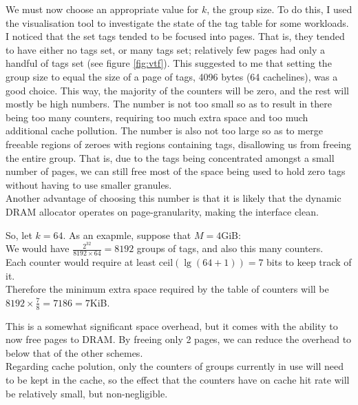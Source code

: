We must now choose an appropriate value for $k$, the group size. To do this, I used the visualisation tool to investigate the state of the tag table for some workloads.
I noticed that the set tags tended to be focused into pages. That is, they tended to have either no tags set, or many tags set; relatively few pages had only a handful of tags set (see figure \ref{fig:vtf}). This suggested to me that setting the group size to equal the size of a page of tags, 4096 bytes (64 cachelines), was a good choice. This way, the majority of the counters will be zero, and the rest will mostly be high numbers. The number is not too small so as to result in there being too many counters, requiring too much extra space and too much additional cache pollution. The number is also not too large so as to merge freeable regions of zeroes with regions containing tags, disallowing us from freeing the entire group. That is, due to the tags being concentrated amongst a small number of pages, we can still free most of the space being used to hold zero tags without having to use smaller granules.\\
Another advantage of choosing this number is that it is likely that the dynamic DRAM allocator operates on page-granularity, making the interface clean.


So, let $k = 64$. As an exapmle, suppose that $M = 4$GiB:\\
We would have $\frac{2^{32}}{8192 \times 64} = 8192$ groups of tags, and also this many counters.\\
Each counter would require at least $\text{ceil}(\lg(64 + 1)) = 7$ bits to keep track of it.\\
Therefore the minimum extra space required by the table of counters will be $8192 \times \frac{7}{8} = 7186 = 7$KiB.

This is a somewhat significant space overhead, but it comes with the ability to now free pages to DRAM. By freeing only 2 pages, we can reduce the overhead to below that of the other schemes.\\
Regarding cache polution, only the counters of groups currently in use will need to be kept in the cache, so the effect that the counters have on cache hit rate will be relatively small, but non-negligible.

